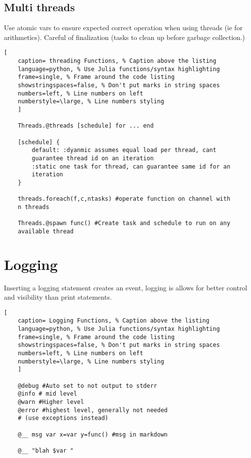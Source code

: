 \documentclass[11pt]{scrartcl} %
\begin{document}
\subsection{Multi threads}

Use atomic vars to ensure expected correct operation when using threads (ie for arithmetics). Careful of
finalization (tasks to clean up before garbage collection.)

\begin{lstlisting}[
	caption= threading Functions, % Caption above the listing
	language=python, % Use Julia functions/syntax highlighting
	frame=single, % Frame around the code listing
	showstringspaces=false, % Don't put marks in string spaces
	numbers=left, % Line numbers on left
	numberstyle=\large, % Line numbers styling
	]

	Threads.@threads [schedule] for ... end

	[schedule] {
		default: :dyanmic assumes equal load per thread, cant 
		guarantee thread id on an iteration
		:static one task for thread, can guarantee same id for an 
		iteration
	}

	threads.foreach(f,c,ntasks) #operate function on channel with 
	n threads

	Threads.@spawn func() #Create task and schedule to run on any 
	available thread

\end{lstlisting}

\newpage
\section{Logging}

Inserting a logging statement creates an event, logging is allows for
better control and visibility than print statements.

\begin{lstlisting}[
	caption= Logging Functions, % Caption above the listing
	language=python, % Use Julia functions/syntax highlighting
	frame=single, % Frame around the code listing
	showstringspaces=false, % Don't put marks in string spaces
	numbers=left, % Line numbers on left
	numberstyle=\large, % Line numbers styling
	]

	@debug #Auto set to not output to stderr
	@info # mid level
	@warn #Higher level
	@error #highest level, generally not needed 
	# (use exceptions instead)

	@__ msg var x=var y=func() #msg in markdown

	@__ "blah $var "

\end{lstlisting}
\end{document}
